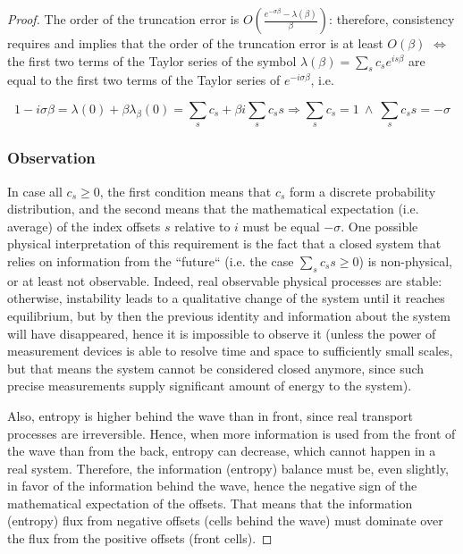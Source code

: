 \documentclass[a4paper]{amsproc}
\theoremstyle{plain}
\theoremstyle{definition}
\theoremstyle{remark}
\numberwithin{equation}{section}
\renewcommand{\ge}{\geqslant}\renewcommand{\geq}{\geqslant}
\begin{document}
\begin{proof}

The order of the truncation error is $ O(\frac{e^{-\sigma\beta} - \lambda(\beta)}{\beta})$: therefore, consistency requires and implies that the order of the truncation error is at least $O(\beta)$ $\Longleftrightarrow$ the first two terms of the Taylor series of the symbol $\lambda(\beta) = \sum\limits_{s} c_s e^{is\beta}$ are equal to the first two terms of the Taylor series of $e^{-i\sigma\beta}$, i.e.

\begin{equation}\label{eq:1.1}
1 - i \sigma \beta = \lambda(0) + \beta\lambda_{\beta}(0) = \sum\limits_{s} c_s + \beta i \sum\limits_{s} c_s s \Longrightarrow \sum\limits_{s} c_s = 1 ~ \wedge ~ \sum\limits_{s} c_s s = -\sigma
\end{equation}

\subsubsection*{Observation}

In case all $c_s \ge 0$, the first condition means that $c_s$ form a discrete probability distribution, and the second means that the mathematical expectation (i.e. average) of the index offsets $s$ relative to $i$ must be equal $-\sigma$. One possible physical interpretation of this requirement is the fact that a closed system that relies on information from the ``future`` (i.e. the case $\sum\limits_{s} c_s s \ge 0$) is non-physical, or at least not observable. Indeed, real observable physical processes are stable: otherwise, instability leads to a qualitative change of the system until it reaches equilibrium, but by then the previous identity and information about the system will have disappeared, hence it is impossible to observe it (unless the power of measurement devices is able to resolve time and space to sufficiently small scales, but that means the system cannot be considered closed anymore, since such precise measurements supply significant amount of energy to the system). 

Also, entropy is higher behind the wave than in front, since real transport processes are irreversible. Hence, when more information is used from the front of the wave than from the back, entropy can decrease, which cannot happen in a real system. Therefore, the information (entropy) balance must be, even slightly, in favor of the information behind the wave, hence the negative sign of the mathematical expectation of the offsets. That means that the information (entropy) flux from negative offsets (cells behind the wave) must dominate over the flux from the positive offsets (front cells).


\end{proof}
\end{document}

